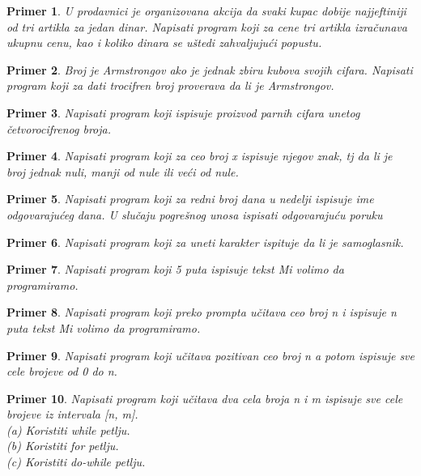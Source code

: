 \documentclass[a4paper]{article}
\newtheorem{primer}{Primer}[section]
\begin{document}
\begin{primer}
U prodavnici je organizovana akcija da svaki kupac dobije
najjeftiniji od tri artikla za jedan dinar. Napisati program koji za cene
tri artikla izračunava ukupnu cenu, kao i koliko dinara se uštedi zahvaljujući
popustu.
\end{primer}

\begin{primer}
Broj je Armstrongov ako je jednak zbiru kubova svojih
cifara. Napisati program koji za dati trocifren broj proverava da li je Armstrongov.
\end{primer}

\begin{primer}
Napisati program koji ispisuje proizvod parnih cifara unetog
četvorocifrenog broja.
\end{primer}

\begin{primer}
Napisati program koji za ceo broj x ispisuje njegov
znak, tj da li je broj jednak nuli, manji od nule ili veći od nule.
\end{primer}

\begin{primer}
Napisati program koji za redni broj dana u nedelji ispisuje
ime odgovarajućeg dana. U slučaju pogrešnog unosa ispisati odgovarajuću
poruku
\end{primer}

\begin{primer}
Napisati program koji za uneti karakter ispituje da li je
samoglasnik.
\end{primer}

\begin{primer}
Napisati program koji 5 puta ispisuje tekst Mi volimo da
programiramo.
\end{primer}

\begin{primer}
Napisati program koji preko prompta učitava ceo broj n i ispisuje n puta
tekst Mi volimo da programiramo.
\end{primer}

\begin{primer}
Napisati program koji učitava pozitivan ceo broj n a potom
ispisuje sve cele brojeve od 0 do n.
\end{primer}

\begin{primer}
Napisati program koji učitava dva cela broja n i m ispisuje
sve cele brojeve iz intervala [n, m].\\
(a) Koristiti while petlju.\\
(b) Koristiti for petlju.\\
(c) Koristiti do-while petlju.\\
\end{primer}
\end{document}
